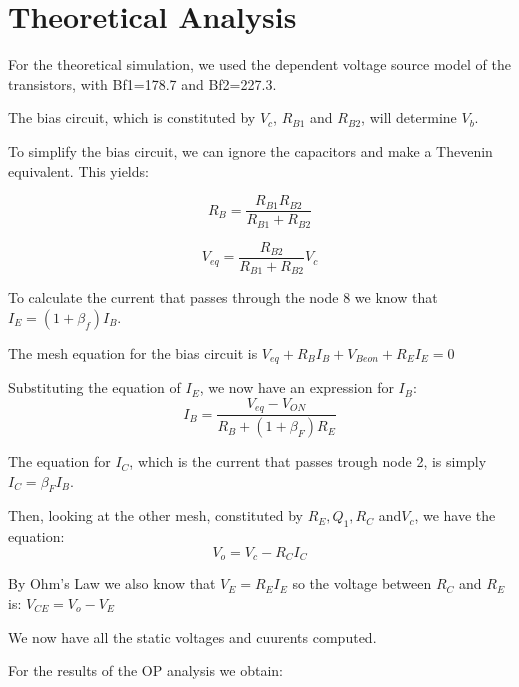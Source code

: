 \section{Theoretical Analysis}
\label{sec:analysis}

For the theoretical simulation, we used the dependent voltage source model of the transistors, with Bf1=178.7 and Bf2=227.3.

The bias circuit, which is constituted by $V_c$, $R_{B1}$ and $R_{B2}$, will determine $V_b$.

To simplify the bias circuit, we can ignore the capacitors and make a Thevenin equivalent. This yields:

\begin{equation}
	R_B=\frac{R_{B1} R_{B2}}{R_{B1}+R_{B2}}
\end{equation}

\begin{equation}
	V_{eq}= \frac{R_{B2}}{R_{B1}+R_{B2}} V_{c}
\end{equation}

To calculate the current that passes through the node 8 we know that $I_E= (1+\beta_f)I_B$.

The mesh equation for the bias circuit is $V_{eq} + R_BI_B + V_{Beon} + R_EI_E =0$

Substituting the equation of $I_E$, we now have an expression for $I_B$:
\begin{equation}
	I_{B}= \frac{V_{eq}-V_{ON}}{R_{B}+(1+\beta_F)R_{E}}
\end{equation}

The equation for $I_C$, which is the current that passes trough node 2, is simply $I_C = \beta_F I_B$.

Then, looking at the other mesh, constituted by $R_E, Q_1, R_C$ and$ V_c$, we have the equation:
\begin{equation}
	V_{o}= V_c-R_{C}I_{C}
\end{equation}

By Ohm's Law we also know that $V_E= R_EI_E$ so the voltage between $R_C$ and $R_E$ is: $V_{CE} = V_o - V_E$


We now have all the static voltages and cuurents computed.

For the results of the OP analysis we obtain:

